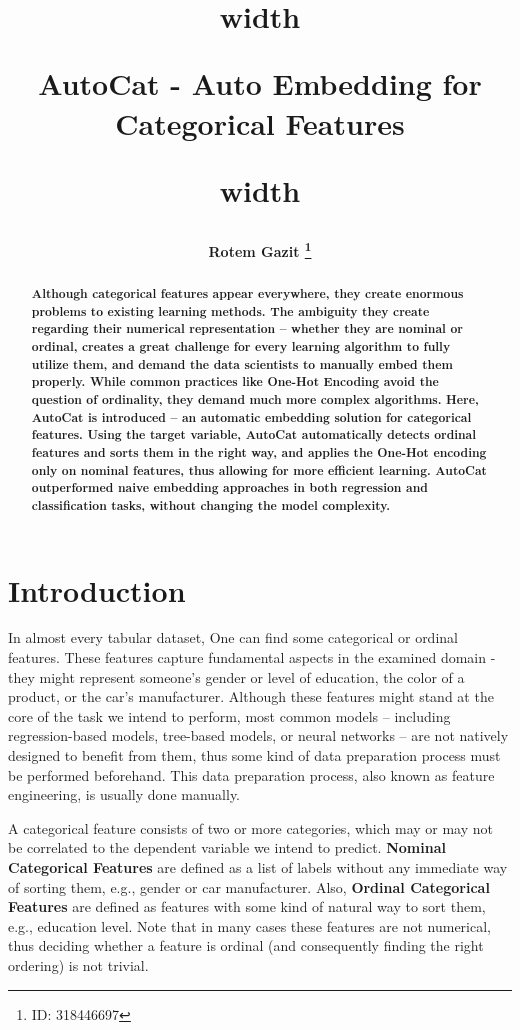 \documentclass{article}
\title{
\noindent\vrule height 2.5pt width \textwidth
\begin{center}
    \bfseries AutoCat - Auto Embedding for Categorical Features
\end{center}
\noindent\vrule height 2.5pt width \textwidth
}
\author{\bfseries Rotem Gazit \thanks{ID: 318446697}}
\date{}
\begin{document}
\maketitle


\begin{abstract}
\bfseries
Although categorical features appear everywhere, they create enormous problems to existing learning methods. The ambiguity they create regarding their numerical representation -- whether they are nominal or ordinal, creates a great challenge for every learning algorithm to fully utilize them, and demand the data scientists to manually embed them properly. While common practices like One-Hot Encoding avoid the question of ordinality, they demand much more complex algorithms. Here, AutoCat is introduced -- an automatic embedding solution for categorical features. Using the target variable, AutoCat automatically detects ordinal features and sorts them in the right way, and applies the One-Hot encoding only on nominal features, thus allowing for more efficient learning. AutoCat outperformed naive embedding approaches in both regression and classification tasks, without changing the model complexity.
\end{abstract}

\section{Introduction}
In almost every tabular dataset, One can find some categorical or ordinal features. These features capture fundamental aspects in the examined domain - they might represent someone’s gender or level of education, the color of a product, or the car’s manufacturer. Although these features might stand at the core of the task we intend to perform, most common models – including regression-based models, tree-based models, or neural networks – are not natively designed to benefit from them, thus some kind of data preparation process must be performed beforehand. This data preparation process, also known as feature engineering, is usually done manually.

A categorical feature consists of two or more categories, which may or may not be correlated to the dependent variable we intend to predict. \textbf{Nominal Categorical Features} are defined as a list of labels without any immediate way of sorting them, e.g., gender or car manufacturer. Also, \textbf{Ordinal Categorical Features} are defined as features with some kind of natural way to sort them, e.g., education level. Note that in many cases these features are not numerical, thus deciding whether a feature is ordinal (and consequently finding the right ordering) is not trivial.
\end{document}
